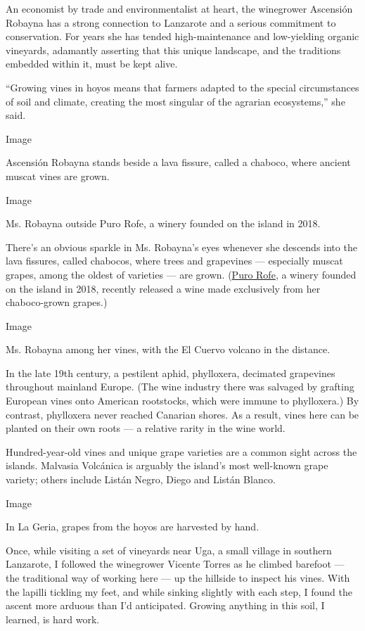 An economist by trade and environmentalist at heart, the winegrower
Ascensión Robayna has a strong connection to Lanzarote and a serious
commitment to conservation. For years she has tended high-maintenance
and low-yielding organic vineyards, adamantly asserting that this unique
landscape, and the traditions embedded within it, must be kept alive.

``Growing vines in hoyos means that farmers adapted to the special
circumstances of soil and climate, creating the most singular of the
agrarian ecosystems,'' she said.

Image

Ascensión Robayna stands beside a lava fissure, called a chaboco, where
ancient muscat vines are grown.

Image

Ms. Robayna outside Puro Rofe, a winery founded on the island in 2018.

There's an obvious sparkle in Ms. Robayna's eyes whenever she descends
into the lava fissures, called chabocos, where trees and grapevines ---
especially muscat grapes, among the oldest of varieties --- are grown.
(\href{https://www.europeancellars.com/producer/puro-rofe/}{Puro Rofe},
a winery founded on the island in 2018, recently released a wine made
exclusively from her chaboco-grown grapes.)

Image

Ms. Robayna among her vines, with the El Cuervo volcano in the distance.

In the late 19th century, a pestilent aphid, phylloxera, decimated
grapevines throughout mainland Europe. (The wine industry there was
salvaged by grafting European vines onto American rootstocks, which were
immune to phylloxera.) By contrast, phylloxera never reached Canarian
shores. As a result, vines here can be planted on their own roots --- a
relative rarity in the wine world.

Hundred-year-old vines and unique grape varieties are a common sight
across the islands. Malvasia Volcánica is arguably the island's most
well-known grape variety; others include Listán Negro, Diego and Listán
Blanco.

Image

In La Geria, grapes from the hoyos are harvested by hand.

Once, while visiting a set of vineyards near Uga, a small village in
southern Lanzarote, I followed the winegrower Vicente Torres as he
climbed barefoot --- the traditional way of working here --- up the
hillside to inspect his vines. With the lapilli tickling my feet, and
while sinking slightly with each step, I found the ascent more arduous
than I'd anticipated. Growing anything in this soil, I learned, is hard
work.

